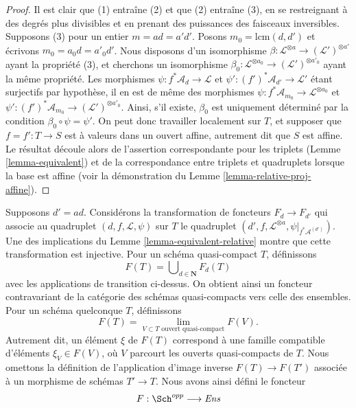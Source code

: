 \begin{proof}
Il est clair que (1) entraîne (2) et que (2) entraîne (3), en se restreignant
à des degrés plus divisibles et en prenant des puissances des faisceaux
inversibles. Supposons (3) pour un entier $m = ad = a'd'$.
Posons $m_0 = \text{lcm}(d, d')$ et écrivons $m_0 = a_0d = a'_0d'$.
Nous disposons d'un isomorphisme
$\beta : \mathcal{L}^{\otimes a} \to (\mathcal{L}')^{\otimes a'}$
ayant la propriété (3), et cherchons un isomorphisme
$\beta_0 : \mathcal{L}^{\otimes a_0} \to (\mathcal{L}')^{\otimes a'_0}$
ayant la même propriété. Les morphismes
$\psi : f^*\mathcal{A}_d \to \mathcal{L}$ et
$\psi' : (f')^*\mathcal{A}_{d'} \to \mathcal{L}'$ étant surjectifs par
hypothèse, il en est de même des morphismes
$\psi : f^*\mathcal{A}_{m_0} \to \mathcal{L}^{\otimes a_0}$ et
$\psi' : (f')^*\mathcal{A}_{m_0} \to (\mathcal{L}')^{\otimes a'_0}$.
Ainsi, s'il existe, $\beta_0$ est uniquement déterminé par la condition
$\beta_0 \circ \psi = \psi'$. On peut donc travailler localement sur $T$,
et supposer que $f = f' : T \to S$ est à valeurs dans un ouvert affine,
autrement dit que $S$ est affine. Le résultat découle alors de l'assertion
correspondante pour les triplets (Lemme \ref{lemma-equivalent}) et de la
correspondance entre triplets et quadruplets lorsque la base est affine
(voir la démonstration du Lemme \ref{lemma-relative-proj-affine}).
\end{proof}

\noindent
Supposons $d' = ad$. Considérons la transformation de foncteurs
$F_d \to F_{d'}$ qui associe au quadruplet $(d, f, \mathcal{L}, \psi)$ sur
$T$ le quadruplet
$(d', f, \mathcal{L}^{\otimes a}, \psi|_{f^*\mathcal{A}^{(d')}})$.
Une des implications du Lemme \ref{lemma-equivalent-relative} montre que
cette transformation est injective. Pour un schéma quasi-compact $T$,
définissons
$$
F(T) = \bigcup\nolimits_{d \in \mathbf{N}} F_d(T)
$$
avec les applications de transition ci-dessus. On obtient ainsi un foncteur
contravariant de la catégorie des schémas quasi-compacts vers celle des
ensembles. Pour un schéma quelconque $T$, définissons
$$
F(T)
=
\lim_{V \subset T\text{ ouvert quasi-compact}} F(V).
$$
Autrement dit, un élément $\xi$ de $F(T)$ correspond à une famille
compatible d'éléments $\xi_V \in F(V)$, où $V$ parcourt les ouverts
quasi-compacts de $T$. Nous omettons la définition de l'application d'image
inverse $F(T) \to F(T')$ associée à un morphisme de schémas $T' \to T$.
Nous avons ainsi défini le foncteur
\begin{equation}
\label{equation-proj}
F : \Sch^{opp} \longrightarrow \textit{Ens}
\end{equation}

